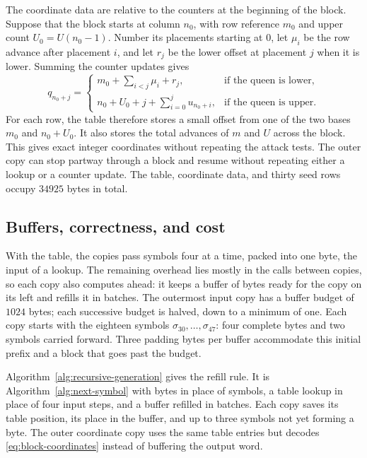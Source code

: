 The coordinate data are relative to the counters at the beginning of
the block. Suppose that the block starts at column $n_0$, with row
reference $m_0$ and upper count $U_0=U(n_0-1)$. Number its placements
starting at $0$, let $\mu_i$ be the row advance after placement $i$,
and let $r_j$ be the lower offset at placement $j$ when it is lower.
Summing the counter updates gives
\begin{equation}\label{eq:block-coordinates}
 q_{n_0+j}=
 \begin{cases}
  m_0+\displaystyle\sum_{i<j}\mu_i+r_j,
    &\text{if the queen is lower},\\[4pt]
  n_0+U_0+j+\displaystyle\sum_{i=0}^{j}u_{n_0+i},
    &\text{if the queen is upper}.
 \end{cases}
\end{equation}
For each row, the table therefore stores a small offset from one of
the two bases $m_0$ and $n_0+U_0$. It also stores the total advances
of $m$ and $U$ across the block. This gives exact integer coordinates
without repeating the attack tests. The outer copy can stop partway
through a block and resume without repeating either a lookup or a
counter update. The table, coordinate data, and thirty seed rows
occupy $34925$ bytes in total.

\subsection{Buffers, correctness, and cost}\label{sec:generator-cost}

With the table, the copies pass symbols four at a time, packed into
one byte, the input of a lookup. The remaining overhead lies mostly
in the calls between copies, so each copy also computes ahead: it
keeps a buffer of bytes ready for the copy on its left and refills it
in batches. The outermost input copy has a buffer budget of $1024$
bytes; each successive budget is halved, down to a minimum of one.
Each copy starts with the eighteen symbols
$\sigma_{30},\ldots,\sigma_{47}$: four complete bytes and two symbols
carried forward. Three padding bytes per buffer accommodate this
initial prefix and a block that goes past the budget.

Algorithm~\ref{alg:recursive-generation} gives the refill rule. It is
Algorithm~\ref{alg:next-symbol} with bytes in place of symbols, a
table lookup in place of four input steps, and a buffer refilled in
batches. Each copy
saves its table position, its place in the buffer, and up to three
symbols not yet forming a byte. The outer coordinate copy uses the
same table entries but decodes \eqref{eq:block-coordinates} instead
of buffering the output word.

